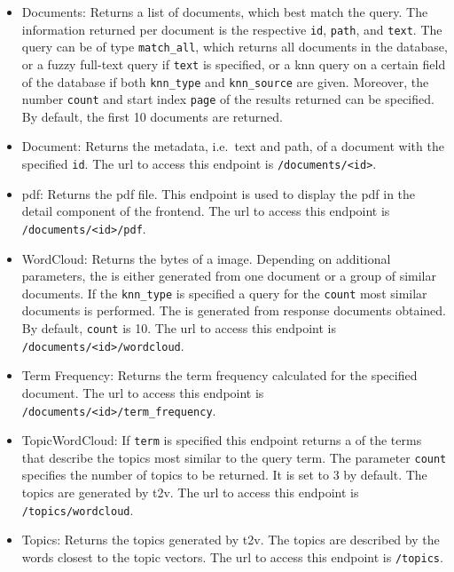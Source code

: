 \begin{itemize}
    \item \label{pt:docs}Documents: 
        Returns a list of documents, which best match the query.
        The information returned per document is the respective \texttt{id}, \texttt{path}, and \texttt{text}.
        The query can be of type \texttt{match\_all}, which returns all documents in the database, 
        or a fuzzy full-text query if \texttt{text} is specified, 
        or a \ac{knn} query on a certain field of the database if both \texttt{knn\_type} and \texttt{knn\_source} are given.
        Moreover, the number \texttt{count} and start index \texttt{page} of the results returned can be specified.
        By default, the first 10 documents are returned.

    \item \label{pt:doc}Document: 
        Returns the metadata, i.e.\ text and path, of a document with the specified \texttt{id}.
        The \ac{url} to access this endpoint is \texttt{/documents/<id>}.

    \item \label{pt:pdf}\ac{pdf}: 
        Returns the \ac{pdf} file.
        This endpoint is used to display the \ac{pdf} in the detail component of the frontend.
        The \ac{url} to access this endpoint is \texttt{/documents/<id>/pdf}.
    
    \item \label{pt:wordcloud}WordCloud: 
        Returns the bytes of a \wordcloud{} image. 
        Depending on additional parameters, the \wordcloud{} is either generated from one document or 
        a group of similar documents.
        If the \texttt{knn\_type} is specified a query for the \texttt{count} most similar documents is performed.
        The \wordcloud{} is generated from response documents obtained.
        By default, \texttt{count} is 10.
        The \ac{url} to access this endpoint is \texttt{/documents/<id>/wordcloud}.

    \item \label{pt:termfrequency}Term Frequency:
        Returns the term frequency calculated for the specified document.
        The \ac{url} to access this endpoint is \texttt{/documents/<id>/term\_frequency}.
        
    \item \label{pt:topic_wordcloud}TopicWordCloud:
        If \texttt{term} is specified this endpoint returns a \wordcloud{} of the terms that describe the topics most similar to the query term.
        The parameter \texttt{count} specifies the number of topics to be returned.
        It is set to 3 by default.
        The topics are generated by \ac{t2v}.
        The \ac{url} to access this endpoint is \texttt{/topics/wordcloud}.

    \item \label{pt:topic}Topics: 
        Returns the topics generated by \ac{t2v}. 
        The topics are described by the words closest to the topic vectors.
        The \ac{url} to access this endpoint is \texttt{/topics}.
\end{itemize}

